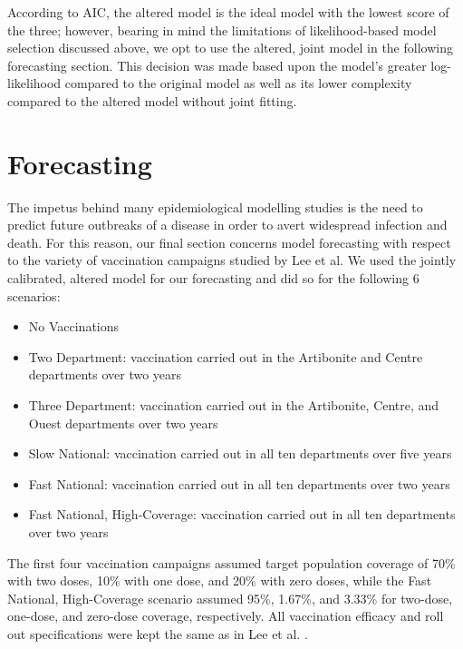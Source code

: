 \documentclass[12pt]{article}
\begin{document}
  According to AIC, the altered model is the ideal model with the lowest score of the three; however, bearing in mind the limitations of likelihood-based model selection discussed above, we opt to use the altered, joint model in the following forecasting section. This decision was made based upon the model's greater log-likelihood compared to the original model as well as its lower complexity compared to the altered model without joint fitting. 

\section{Forecasting}

  The impetus behind many epidemiological modelling studies is the need to predict future outbreaks of a disease in order to avert widespread infection and death. For this reason, our final section concerns model forecasting with respect to the variety of vaccination campaigns studied by Lee et al. We used the jointly calibrated, altered model for our forecasting and did so for the following 6 scenarios:
        \begin{itemize}
        \item No Vaccinations
        \item Two Department: vaccination carried out in the Artibonite and Centre departments over two years
        \item Three Department: vaccination carried out in the Artibonite, Centre, and Ouest departments over two years
        \item Slow National: vaccination carried out in all ten departments over five years
        \item Fast National: vaccination carried out in all ten departments over two years
        \item Fast National, High-Coverage: vaccination carried out in all ten departments over two years
        \end{itemize}
        
  The first four vaccination campaigns assumed target population coverage of 70\% with two doses, 10\% with one dose, and 20\% with zero doses, while the Fast National, High-Coverage scenario assumed 95\%, 1.67\%, and 3.33\% for two-dose, one-dose, and zero-dose coverage, respectively. All vaccination efficacy and roll out specifications were kept the same as in Lee et al. \cite{Lee_supp}.
\end{document}
